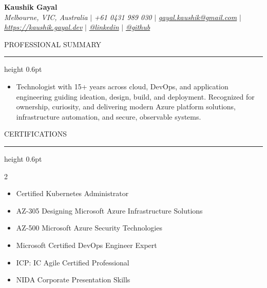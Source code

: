 \documentclass[letterpaper,10pt]{article}
\newcommand{\ResumeName}[1]{\textbf{\fontsize{18pt}{20pt}\selectfont #1}}
\newcommand{\ResumeSection}[1]{\par{\fontsize{11pt}{13pt}\selectfont \MakeUppercase{#1}}\vspace{1pt}\hrule height 0.6pt}
\begin{document}
\begin{flushleft}
    \ResumeName{Kaushik Gayal} \\
    \textit{Melbourne, VIC, Australia} $|$ 
    \textit{+61 0431 989 030} $|$  
    \href{mailto:gayal.kaushik@gmail.com}{\textit{gayal.kaushik@gmail.com}} $|$
    \href{https://kaushik.gayal.dev}{\textit{https://kaushik.gayal.dev}} $|$
    \href{https://www.linkedin.com/in/kaushik-gayal-02a57316/}{\textit{@linkedin}} $|$
    \href{https://github.com/koshikg}{\textit{@github}}
    \vspace{-2pt}
\end{flushleft}

\ResumeSection{Professional Summary}
\vspace{-2pt}
\begin{itemize}[leftmargin=0.15in, label={}]
    \item{Technologist with 15+ years across cloud, DevOps, and application engineering guiding ideation, design, build, and deployment. Recognized for ownership, curiosity, and delivering modern Azure platform solutions, infrastructure automation, and secure, observable systems.}
\end{itemize}


\ResumeSection{Certifications}\vspace{-8pt}
\begin{multicols}{2}
\begin{itemize}[leftmargin=0.1in, itemsep=0pt, parsep=0pt, topsep=0pt]
\item {Certified Kubernetes Administrator}
\item {AZ-305 Designing Microsoft Azure Infrastructure Solutions}
\item {AZ-500 Microsoft Azure Security Technologies}
\item {Microsoft Certified DevOps Engineer Expert}
\item {ICP: IC Agile Certified Professional}
\item {NIDA Corporate Presentation Skills}
\end{itemize}
\end{multicols}
\end{document}
